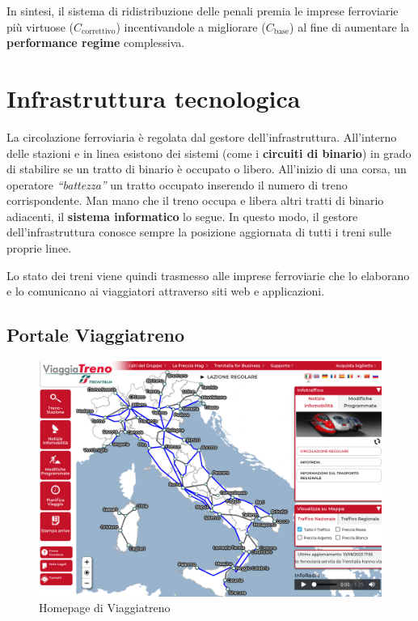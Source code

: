 \documentclass[12pt,italian]{report}
\begin{document}
In sintesi, il sistema di ridistribuzione delle penali premia le
imprese ferroviarie più virtuose ($C_\text{correttivo}$)
incentivandole a migliorare ($C_\text{base}$) al fine di aumentare la
\textbf{performance regime} complessiva.

\section{Infrastruttura tecnologica}

La circolazione ferroviaria è regolata dal gestore
dell'infrastruttura.  All'interno delle stazioni e in linea esistono
dei sistemi (come i \textbf{circuiti di binario}) in grado di
stabilire se un tratto di binario è occupato o libero.  All'inizio di
una corsa, un operatore \textit{``battezza''} un tratto occupato
inserendo il numero di treno corrispondente.  Man mano che il treno
occupa e libera altri tratti di binario adiacenti, il \textbf{sistema
    informatico} lo segue.  In questo modo, il gestore
dell'infrastruttura conosce sempre la posizione aggiornata di tutti i
treni sulle proprie linee.

Lo stato dei treni viene quindi trasmesso alle imprese ferroviarie che
lo elaborano e lo comunicano ai viaggiatori attraverso siti web e
applicazioni.

\subsection{Portale Viaggiatreno}
\label{viaggiatreno}

\begin{figure}[h] \centering
    \includegraphics[width=1\textwidth]{images/viaggiatreno.png}
	\caption{Homepage di Viaggiatreno}
\end{figure}
\end{document}
